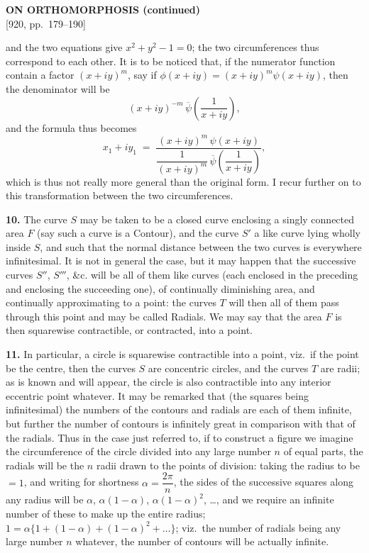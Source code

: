 \documentclass[11pt,a4paper]{article}
\begin{document}
\setcounter{page}{179}

\begin{center}
{\large\bfseries ON ORTHOMORPHOSIS (continued)}\\[0.4em]
{\small [920, pp.\ 179--190]}
\end{center}
\vspace{0.4em}

and the two equations give $x^2 + y^2 - 1 = 0$; the two circumferences thus correspond to each other. It is to be noticed that, if the numerator function contain a factor $(x + iy)^m$, say if $\phi(x + iy) = (x + iy)^m \psi(x + iy)$, then the denominator will be
\[
(x+iy)^{-m}\,\overline{\psi}\!\left(\frac{1}{x+iy}\right),
\]
and the formula thus becomes
\[
x_1 + i y_1 \;=\; \frac{(x + iy)^m\,\psi(x + iy)}{\dfrac{1}{(x+iy)^m}\,\overline{\psi}\!\left(\dfrac{1}{x+iy}\right)},
\]
which is thus not really more general than the original form. I recur further on to this transformation between the two circumferences.

\textbf{10.} The curve $S$ may be taken to be a closed curve enclosing a singly connected area $F$ (say such a curve is a Contour), and the curve $S'$ a like curve lying wholly inside $S$, and such that the normal distance between the two curves is everywhere infinitesimal. It is not in general the case, but it may happen that the successive curves $S''$, $S'''$, \&c. will be all of them like curves (each enclosed in the preceding and enclosing the succeeding one), of continually diminishing area, and continually approximating to a point: the curves $T$ will then all of them pass through this point and may be called Radials. We may say that the area $F$ is then squarewise contractible, or contracted, into a point.

\textbf{11.} In particular, a circle is squarewise contractible into a point, viz.\ if the point be the centre, then the curves $S$ are concentric circles, and the curves $T$ are radii; as is known and will appear, the circle is also contractible into any interior eccentric point whatever. It may be remarked that (the squares being infinitesimal) the numbers of the contours and radials are each of them infinite, but further the number of contours is infinitely great in comparison with that of the radials. Thus in the case just referred to, if to construct a figure we imagine the circumference of the circle divided into any large number $n$ of equal parts, the radials will be the $n$ radii drawn to the points of division: taking the radius to be $=1$, and writing for shortness $\alpha = \dfrac{2\pi}{n}$, the sides of the successive squares along any radius will be $\alpha$, $\alpha(1-\alpha)$, $\alpha(1-\alpha)^2$, \ldots, and we require an infinite number of these to make up the entire radius; $1 = \alpha\{1 + (1-\alpha) + (1-\alpha)^2 + \ldots\}$; viz.\ the number of radials being any large number $n$ whatever, the number of contours will be actually infinite.
\end{document}
